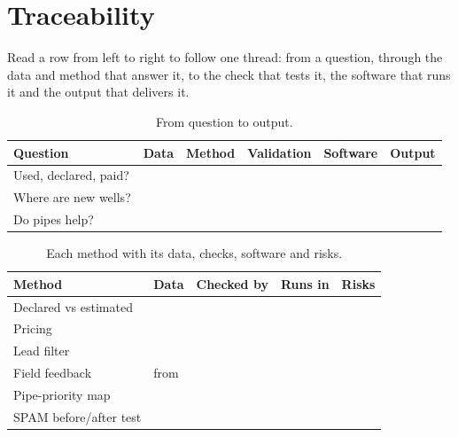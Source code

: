 \section{Traceability}\label{sec:trace}

\begin{inshort}
Read a row from left to right to follow one thread: from a question, through the data and method that
answer it, to the check that tests it, the software that runs it and the output that delivers it.
\end{inshort}

{\small
\begin{xltabular}{\linewidth}{@{}L{24mm}L{22mm}L{16mm}L{22mm}L{20mm}Y@{}}
\caption{From question to output.}\label{tab:traceq}\\*
\toprule
\textbf{Question} & \textbf{Data} & \textbf{Method} & \textbf{Validation} & \textbf{Software} & \textbf{Output}\\*
\midrule
{} Used, declared, paid? &     &   &   &    &  \\
 Where are new wells? &     &   &    &    &  \\
 Do pipes help? &     &   &     &    &   \\
\bottomrule
\end{xltabular}}

{\small
\begin{xltabular}{\linewidth}{@{}L{46mm}L{24mm}L{22mm}L{18mm}Y@{}}
\caption{Each method with its data, checks, software and risks.}\label{tab:tracem}\\*
\toprule
\textbf{Method} & \textbf{Data} & \textbf{Checked by} & \textbf{Runs in} & \textbf{Risks}\\*
\midrule
{} Declared vs estimated &    &   &  & \\
 Pricing &  &  &  & \\
 Lead filter &   &   &  &   \\
 Field feedback & from  &  &  & \\
 Pipe-priority map &    &   &   & \\
 SPAM before/after test &     &   &  &  \\
\bottomrule
\end{xltabular}}

